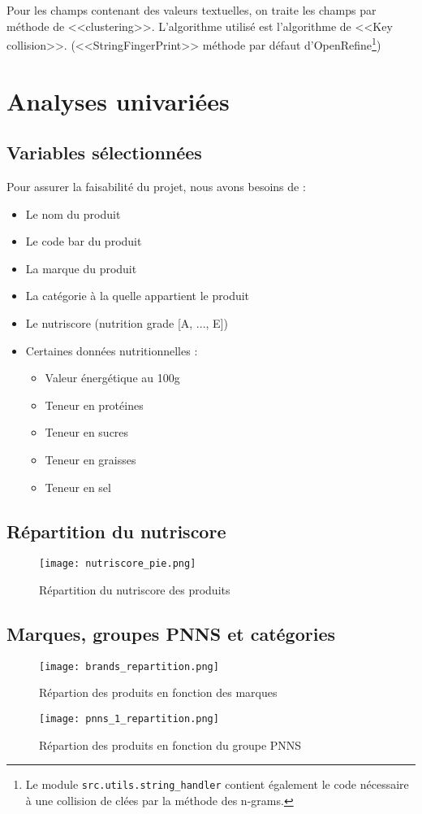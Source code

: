     Pour les champs contenant des valeurs textuelles, on traite les champs
    par méthode de <<clustering>>. L'algorithme utilisé est l'algorithme
    de <<Key collision>>.
    (<<StringFingerPrint>> méthode par défaut
    d'OpenRefine\footnote{Le module \Verb"src.utils.string_handler" contient
    également le code nécessaire à une collision de clées par la méthode des
    n-grams.})


\section{Analyses univariées}

  \subsection{Variables sélectionnées}
  Pour assurer la faisabilité du projet, nous avons besoins de :
  \begin{itemize}
    \item Le nom du produit
    \item Le code bar du produit
    \item La marque du produit
    \item La catégorie à la quelle appartient le produit
    \item Le nutriscore (nutrition grade [A, ..., E])
    \item Certaines données nutritionnelles :
    \begin{itemize}
      \item Valeur énergétique au 100g
      \item Teneur en protéines
      \item Teneur en sucres
      \item Teneur en graisses
      \item Teneur en sel
    \end{itemize}
  \end{itemize}


  \subsection{Répartition du nutriscore}
  \begin{figure}[H]
    \texttt{[image: nutriscore\_pie.png]}
    \caption{Répartition du nutriscore des produits}
    \label{nutriscore_pie}
  \end{figure}

  \subsection{Marques, groupes PNNS et catégories}
  \begin{figure}[H]
    \texttt{[image: brands\_repartition.png]}
    \caption{Répartion des produits en fonction des marques}
    \label{}
  \end{figure}
  \begin{figure}[H]
    \texttt{[image: pnns\_1\_repartition.png]}
    \caption{Répartion des produits en fonction du groupe PNNS}
    \label{}
  \end{figure}


